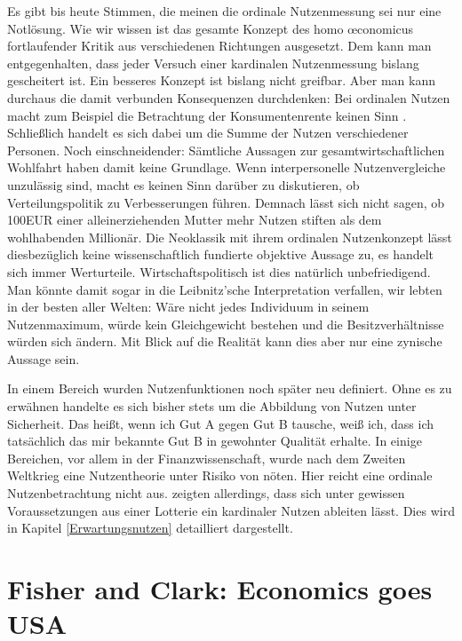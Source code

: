 Es gibt bis heute Stimmen, die meinen die ordinale Nutzenmessung sei nur eine Notlösung. Wie wir wissen ist das gesamte Konzept des homo \oe conomicus fortlaufender Kritik aus verschiedenen Richtungen ausgesetzt. Dem kann man entgegenhalten, dass jeder Versuch einer kardinalen Nutzenmessung bislang gescheitert ist. Ein besseres Konzept ist bislang nicht greifbar. Aber man kann durchaus die damit verbunden Konsequenzen durchdenken: Bei ordinalen Nutzen macht zum Beispiel die Betrachtung der Konsumentenrente keinen Sinn \parencite[S: 400]{Rosner2012}. Schließlich handelt es sich dabei um die Summe der Nutzen verschiedener Personen. Noch einschneidender: Sämtliche Aussagen zur gesamtwirtschaftlichen Wohlfahrt haben damit keine Grundlage. Wenn interpersonelle Nutzenvergleiche unzulässig sind, macht es keinen Sinn darüber zu diskutieren, ob Verteilungspolitik zu Verbesserungen führen. Demnach lässt sich nicht sagen, ob 100EUR einer alleinerziehenden Mutter mehr Nutzen stiften als dem wohlhabenden Millionär. Die Neoklassik mit ihrem ordinalen Nutzenkonzept lässt diesbezüglich keine wissenschaftlich fundierte objektive Aussage zu, es handelt sich immer Werturteile. Wirtschaftspolitisch ist dies natürlich unbefriedigend. Man könnte damit sogar in die Leibnitz'sche Interpretation verfallen, wir lebten in der besten aller Welten: Wäre nicht jedes Individuum in seinem Nutzenmaximum, würde kein Gleichgewicht bestehen und die Besitzverhältnisse würden sich ändern. Mit Blick auf die Realität kann dies aber nur eine zynische Aussage sein.

In einem Bereich wurden Nutzenfunktionen noch später neu definiert. Ohne es zu erwähnen handelte es sich bisher stets um die Abbildung von Nutzen unter Sicherheit. Das heißt, wenn ich Gut A gegen Gut B tausche, weiß ich, dass ich tatsächlich das mir bekannte Gut B in gewohnter Qualität erhalte. In einige Bereichen, vor allem in der Finanzwissenschaft, wurde nach dem Zweiten Weltkrieg eine Nutzentheorie unter Risiko von nöten. Hier reicht eine ordinale Nutzenbetrachtung nicht aus. \textcite{VonNeumann1944} zeigten allerdings, dass sich unter gewissen Voraussetzungen aus einer Lotterie ein kardinaler Nutzen ableiten lässt. Dies wird in Kapitel \ref{Erwartungsnutzen} detailliert dargestellt.

\section{Fisher and Clark: Economics goes USA}
\label{FisherandClark}

